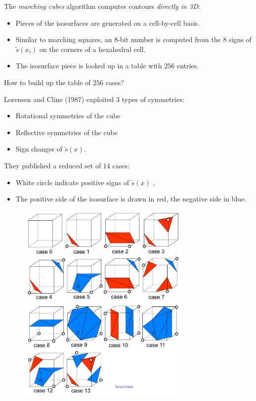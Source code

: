 The \emph{marching cubes} algorithm computes contours \emph{directly in 3D}:
\begin{itemize}
    \item Pieces of the isosurfaces are generated on a cell-by-cell basis.
    \item Similar to marching squares, an $8$-bit number is computed from the $8$ signs of $\tilde s(x_i)$ on the corners of a hexahedral cell.
    \item The isosurface piece is looked up in a table with $256$ entries.
\end{itemize}

How to build up the table of $256$ cases?

Lorensen and Cline (1987) exploited $3$ types of symmetries:
\begin{itemize}
    \item Rotational symmetries of the cube
    \item Reflective symmetries of the cube
    \item Sign changes of $\tilde s(x)$.
\end{itemize}

They published a reduced set of $14$ cases:
\begin{itemize}
    \item White circle indicate positive signs of $\tilde s(x)$ ,
    \item The positive side of the isosurface is drawn in red, the negative side in blue.
\end{itemize}

\begin{figure}[H]
    \centering
    \includegraphics[width=0.75\textwidth]{img/02_marching_cubes}
\end{figure}

